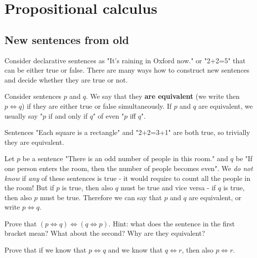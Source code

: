 
\section{Propositional calculus}
\subsection{New sentences from old}
\label{sec:logic}
Consider declarative sentences as "It's raining in Oxford now." or "2+2=5" that can be either true or false. There are many ways how to construct new sentences and decide
whether they are true or not.

\begin{definition}
  Consider sentences $p$ and $q$. We say that they \textbf{are equivalent} (we write then $p\Leftrightarrow q$) if they are either true or false simultaneously.
  If $p$ and $q$ are equivalent, we usually say "$p$ if and only if $q$" of even "$p$ iff $q$".
\end{definition}

\begin{example}
  Sentences "Each square is a rectangle" and "2+2=3+1" are both true, so trivially they are equivalent.
\end{example}

\begin{example}
  Let $p$ be a sentence "There is an odd number of people in this room." and $q$ be "If one person enters the room, then the number of people becomes even".
  We \textit{do not know} if \textit{any} of these sentences is true - it would require to count all the people in the room! But if $p$ is true, then also $q$ must be true and vice versa - if $q$ is true, then also $p$ must be true. Therefore we can say that $p$ and $q$ are equivalent, or write $p\Leftrightarrow q$.
\end{example}

\begin{exercise}
  Prove that $(p\Leftrightarrow q) \Leftrightarrow (q\Leftrightarrow p)$. Hint: what does the sentence in the first bracket mean? What about the second? Why are they equivalent?
\end{exercise}

\begin{exercise}
  Prove that if we know that $p\Leftrightarrow q$ and we know that $q\Leftrightarrow r$, then also $p\Leftrightarrow r$.
\end{exercise}

